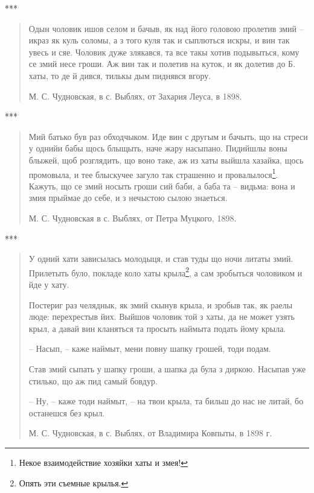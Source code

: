 \begin{center}
***\end{center}

\begin{quotation}
Одын чоловик ишов селом и бачыв, як над його головою пролетив змий – икраз як куль соломы, а з того куля так и сыплються искры, и вин так увесь и сяе. Чоловик дуже злякався, та все такы хотив подывыться, кому се змий несе гроши. Аж вин так и полетив на куток, и як долетив до Б. хаты, то де й дився, тилькы дым пиднявся вгору.

М. С. Чудновская, в с. Выблях, от Захария Леуса, в 1898.
\end{quotation}

\begin{center}
***\end{center}

\begin{quotation}
Мий батько був раз обходчыком. Иде вин с другым и бачыть, що на стреси у однийи бабы щось блыщыть, наче жару насыпано. Пидийшлы воны блыжей, щоб розглядить, що воно таке, аж из хаты выйшла хазайка, щось промовыла, и тее блыскучее загуло так страшенно и провалылося\footnote{Некое взаимодействие хозяйки хаты и змея!}. Кажуть, що се змий носыть гроши сий баби, а баба та – видьма: вона и змия прыймае до себе, и з нечыстою сылою знаеться.

М. С. Чудновская в с. Выблях, от Петра Муцкого, 1898.
\end{quotation}

\begin{center}
***\end{center}

\begin{quotation}
У одний хати зависылась молодыця, и став туды що ночи литаты змий. Прилетыть було, покладе коло хаты крыла\footnote{Опять эти съемные крылья.}, а сам зробыться чоловиком и йде у хату.

Постериг раз челяднык, як змий скынув крыла, и зробыв так, як раелы люде: перехрестыв йих. Выйшов чоловик той з хаты, да не может узять крыл, а давай вин кланяться та просыть наймыта подать йому крыла.

 – Насып, – каже наймыт, мени повну шапку грошей, тоди подам.

Став змий сыпать у шапку гроши, а шапка да була з диркою. Насыпав уже стилько, що аж пид самый бовдур.

 – Ну, – каже тоди наймыт, – на твои крыла, та бильш до нас не литай, бо останешся без крыл.

М. С. Чудновская, в с. Выблях, от Владимира Ковпыты, в 1898 г.
\end{quotation}

